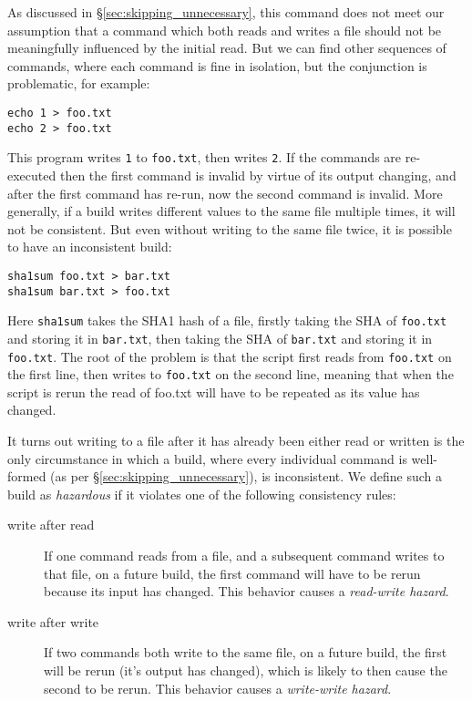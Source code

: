 

As discussed in \S\ref{sec:skipping_unnecessary}, this command does not meet our assumption that a command which both reads and writes a file should not be meaningfully influenced by the initial read. But we can find other sequences of commands, where each command is fine in isolation, but the conjunction is problematic, for example:

\begin{verbatim}
echo 1 > foo.txt
echo 2 > foo.txt
\end{verbatim}

This program writes \texttt{1} to \texttt{foo.txt}, then writes \texttt{2}. If the commands are re-executed then the first command is invalid by virtue of its output changing, and after the first command has re-run, now the second command is invalid. More generally, if a build writes different values to the same file multiple times, it will not be consistent. But even without writing to the same file twice, it is possible to have an inconsistent build:

\begin{verbatim}
sha1sum foo.txt > bar.txt
sha1sum bar.txt > foo.txt
\end{verbatim}

Here \texttt{sha1sum} takes the SHA1 hash of a file, firstly taking the SHA of \texttt{foo.txt} and storing it in \texttt{bar.txt}, then taking the SHA of \texttt{bar.txt} and storing it in \texttt{foo.txt}. The root of the problem is that the script first reads from \texttt{foo.txt} on the first line, then writes to \texttt{foo.txt} on the second line, meaning that when the script is rerun the read of foo.txt will have to be repeated as its value has changed.

It turns out writing to a file after it has already been either read or written is the only circumstance in which a build, where every individual command is well-formed (as per \S\ref{sec:skipping_unnecessary}), is inconsistent. We define such a build as \emph{hazardous} if it violates one of the following consistency rules:

\begin{description}
\item[write after read] If one command reads from a file, and a subsequent command writes to that file, on a future build, the first command will have to be rerun because its input has changed.  This behavior causes a \emph{read-write hazard}.
\item[write after write] If two commands both write to the same file, on a future build, the first will be rerun (it's output has changed), which is likely to then cause the second to be rerun.  This behavior causes a \emph{write-write hazard}.
\end{description}

